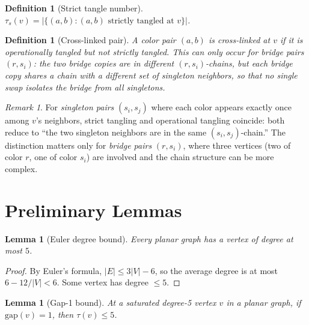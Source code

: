 \documentclass[11pt]{article}
\newtheorem{lemma}[theorem]{Lemma}
\newtheorem{definition}[theorem]{Definition}
\theoremstyle{remark}
\newtheorem{remark}[theorem]{Remark}
\begin{document}
\begin{definition}[Strict tangle number]
$\tau_s(v) = |\{(a,b) : (a,b) \text{ strictly tangled at } v\}|$.
\end{definition}

\begin{definition}[Cross-linked pair]
A color pair $(a,b)$ is \emph{cross-linked} at $v$ if it is operationally tangled but not strictly tangled. This can only occur for bridge pairs $(r, s_i)$: the two bridge copies are in different $(r, s_i)$-chains, but each bridge copy shares a chain with a different set of singleton neighbors, so that no single swap isolates the bridge from all singletons.
\end{definition}

\begin{remark}
For \emph{singleton pairs} $(s_i, s_j)$ where each color appears exactly once among $v$'s neighbors, strict tangling and operational tangling coincide: both reduce to ``the two singleton neighbors are in the same $(s_i, s_j)$-chain.'' The distinction matters only for \emph{bridge pairs} $(r, s_i)$, where three vertices (two of color $r$, one of color $s_i$) are involved and the chain structure can be more complex.
\end{remark}

\section{Preliminary Lemmas}

\begin{lemma}[Euler degree bound]
Every planar graph has a vertex of degree at most $5$.
\end{lemma}

\begin{proof}
By Euler's formula, $|E| \leq 3|V| - 6$, so the average degree is at most $6 - 12/|V| < 6$. Some vertex has degree $\leq 5$.
\end{proof}

\begin{lemma}[Gap-1 bound]
At a saturated degree-5 vertex $v$ in a planar graph, if $\mathrm{gap}(v) = 1$, then $\tau(v) \leq 5$.
\end{lemma}
\end{document}
